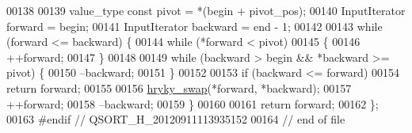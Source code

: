 \begin{DoxyCode}
00138 
00139     value\_type \textcolor{keyword}{const} pivot = *(begin + pivot\_pos);
00140     InputIterator forward = begin;
00141     InputIterator backward = end - 1;
00142 
00143     \textcolor{keywordflow}{while} (forward <= backward) \{
00144         \textcolor{keywordflow}{while} (*forward < pivot)
00145         \{ 
00146             ++forward;
00147         \}
00148 
00149         \textcolor{keywordflow}{while} (backward > begin && *backward >= pivot) \{
00150             --backward;
00151         \}
00152 
00153         \textcolor{keywordflow}{if} (backward <= forward)
00154             \textcolor{keywordflow}{return} forward;
00155 
00156         \hyperlink{namespacehryky_add9c1c1fdfda07cd47bcb7c16d3a823a}{hryky_swap}(*forward, *backward);
00157         ++forward;
00158         --backward;
00159     \}
00160     
00161     \textcolor{keywordflow}{return} forward;
00162 \};
00163 \textcolor{preprocessor}{#endif // QSORT\_H\_20120911113935152}
00164 \textcolor{preprocessor}{}\textcolor{comment}{// end of file}
\end{DoxyCode}
